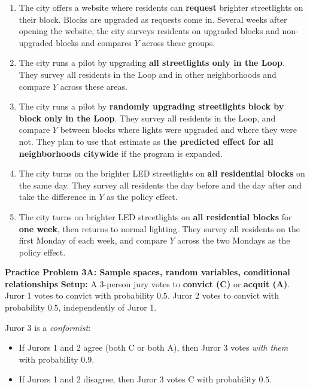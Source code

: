 \documentclass[12pt]{article}
\begin{document}
\vspace{0.5em}
  \begin{enumerate}[label=\arabic*.]
    \item The city offers a website where residents can \textbf{request} brighter streetlights on their block.
    Blocks are upgraded as requests come in. Several weeks after opening the website, the city surveys residents on upgraded blocks and
    non-upgraded blocks and compares $Y$ across these groups.

    \item The city runs a pilot by upgrading \textbf{all streetlights only in the Loop}. They survey all residents in the Loop and in other neighborhoods and compare $Y$ across these areas.

    \item The city runs a pilot by \textbf{randomly upgrading streetlights block by block only in the Loop}. They survey all residents in the Loop, and compare $Y$ between blocks where lights were upgraded and where they were not. 
    They plan to use that estimate as \textbf{the predicted effect for all neighborhoods citywide}
    if the program is expanded.

    \item The city turns on the brighter LED streetlights on \textbf{all residential blocks} on the same day. They survey all residents the day before and the day after and take the difference in $Y$ as the policy effect.

    \item The city turns on brighter LED streetlights on \textbf{all residential blocks} for \textbf{one week}, then returns to
    normal lighting. They survey all residents on the first Monday of each week, and compare $Y$ across the two Mondays as the policy effect.

\end{enumerate}

\noindent\textbf{Practice Problem 3A: Sample spaces, random variables, conditional relationships}
\noindent \textbf{Setup:} A 3-person jury votes to \textbf{convict (C)} or \textbf{acquit (A)}.
Juror 1 votes to convict with probability $0.5$.
Juror 2 votes to convict with probability $0.5$, independently of Juror 1.

Juror 3 is a \emph{conformist}:
\begin{itemize}
  \item If Jurors 1 and 2 agree (both C or both A), then Juror 3 votes \emph{with them} with probability $0.9$.
  \item If Jurors 1 and 2 disagree, then Juror 3 votes C with probability $0.5$.
\end{itemize}
\end{document}
